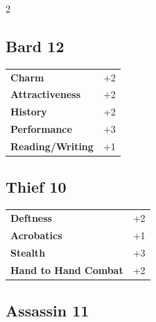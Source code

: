 \begin{multicols}{2}
\begin{tcolorbox}
\end{tcolorbox}

\begin{tcolorbox}
    \subsection*{Bard \hfill \small{12 }}
    \tcblower




\begin{tabular}{@{}ll@{}}
    \textbf{Charm} & +2\\
    \textbf{Attractiveness} & +2\\
    \textbf{History} & +2\\
    \textbf{Performance} & +3\\
    \textbf{Reading/Writing} & +1\\
\end{tabular}


\end{tcolorbox}

\begin{tcolorbox}
    \subsection*{Thief \hfill \small{10 }}
    \tcblower




\begin{tabular}{@{}ll@{}}
    \textbf{Deftness} & +2\\
    \textbf{Acrobatics} & +1\\
    \textbf{Stealth} & +3\\
    \textbf{Hand to Hand Combat} & +2\\
\end{tabular}


\end{tcolorbox}

\begin{tcolorbox}
    \subsection*{Assassin \hfill \small{11 }}
    \tcblower





\end{tcolorbox}
\end{multicols}
